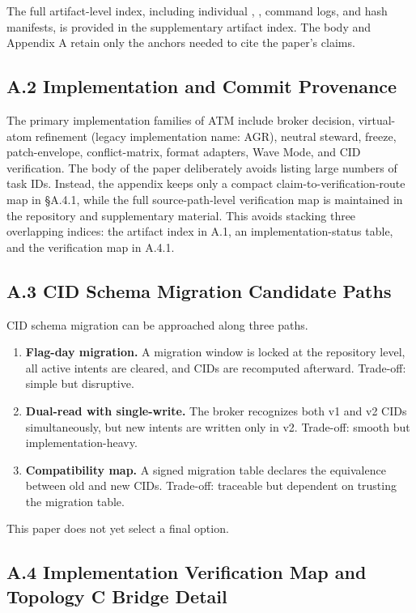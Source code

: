 \documentclass[9pt,letterpaper]{extarticle}
\begin{document}
The full artifact-level index, including individual \texttt{}, \texttt{}, command logs, and hash manifests, is provided in the supplementary artifact index. The body and Appendix A retain only the anchors needed to cite the paper's claims.

\subsection*{A.2 Implementation and Commit Provenance}

The primary implementation families of ATM include broker decision, virtual-atom refinement (legacy implementation name: AGR), neutral steward, freeze, patch-envelope, conflict-matrix, format adapters, Wave Mode, and CID verification. The body of the paper deliberately avoids listing large numbers of task IDs. Instead, the appendix keeps only a compact claim-to-verification-route map in §A.4.1, while the full source-path-level verification map is maintained in the repository and supplementary material. This avoids stacking three overlapping indices: the artifact index in A.1, an implementation-status table, and the verification map in A.4.1.

\subsection*{A.3 CID Schema Migration Candidate Paths}

CID schema migration can be approached along three paths.

\begin{enumerate}
\item \textbf{Flag-day migration.} A migration window is locked at the repository level, all active intents are cleared, and CIDs are recomputed afterward. Trade-off: simple but disruptive.
\item \textbf{Dual-read with single-write.} The broker recognizes both v1 and v2 CIDs simultaneously, but new intents are written only in v2. Trade-off: smooth but implementation-heavy.
\item \textbf{Compatibility map.} A signed migration table declares the equivalence between old and new CIDs. Trade-off: traceable but dependent on trusting the migration table.
\end{enumerate}

This paper does not yet select a final option.

\subsection*{A.4 Implementation Verification Map and Topology C Bridge Detail}
\end{document}
